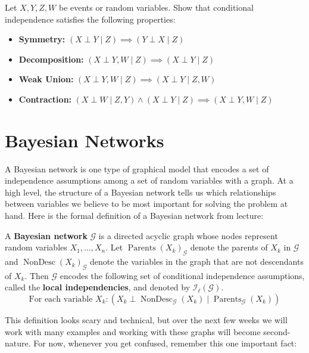 \documentclass{discussion}
\DeclareMathOperator{\Parents}{Parents}
\DeclareMathOperator{\NonDesc}{NonDesc}
\newcommand{\G}{\mathcal{G}}
\newcommand{\I}{\mathcal{I}}
\begin{document}
\begin{exercise}
Let $X,Y,Z,W$ be events or random variables.  Show that conditional independence satisfies the following properties:
    \begin{itemize}
    \item \textbf{Symmetry:}  $(X \perp Y \mid Z) \implies (Y \perp X \mid Z)$
    \item \textbf{Decomposition:} $(X \perp Y,W \mid Z) \implies (X \perp Y \mid Z)$
    \item \textbf{Weak Union:} $(X \perp Y,W \mid Z) \implies (X \perp Y \mid Z,W)$
    \item \textbf{Contraction:} $(X \perp W \mid Z,Y) \wedge (X \perp Y \mid Z) \implies (X \perp Y,W \mid Z)$
    \end{itemize}
\end{exercise}

\section{Bayesian Networks}

A Bayesian network is one type of graphical model that encodes a set of independence assumptions among a set of random variables with a graph.  At a high level, the structure of a Bayesian network tells us which relationships between variables we believe to be most important for solving the problem at hand.  Here is the formal definition of a Bayesian network from lecture:

\begin{definition}
A \textbf{Bayesian network} $\G$ is a directed acyclic graph whose nodes represent random variables $X_1, \dots, X_n$.  Let $\Parents(X_k)_\G$ denote the parents of $X_k$ in $\G$ and $\NonDesc(X_k)_\G$ denote the variables in the graph that are not descendants of $X_k$.  Then $\G$ encodes the following set of conditional independence assumptions, called the \textbf{local independencies}, and denoted by $\I_{\ell}(\G)$.
    \begin{equation*}
    \text{For each variable $X_k$}:  (X_k \perp \NonDesc_\G(X_k) \mid \Parents_\G(X_k))
    \end{equation*}
\end{definition}%

\noindent This definition looks scary and technical, but over the next few weeks we will work with many examples and working with these graphs will become second-nature.  For now, whenever you get confused, remember this one important fact:
\end{document}
